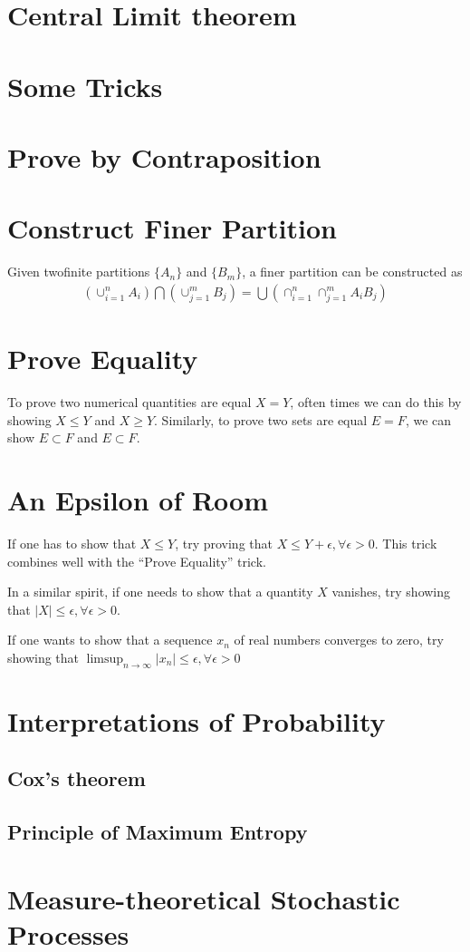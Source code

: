 \section{Central Limit theorem}

\section{Some Tricks}
\section{Prove by Contraposition}

\section{Construct Finer Partition}
Given twofinite partitions $\{A_n\}$ and $\{B_m\}$, a finer partition can be constructed as
\begin{align*}
	(\cup_{i=1}^n A_i) \bigcap (\cup_{j=1}^m B_j) = \bigcup (\cap_{i=1}^n \cap_{j=1}^m A_i B_j)
\end{align*}

\section{Prove Equality}
To prove two numerical quantities are equal $X=Y$, often times we can do this by showing $X \le Y$ and $X \ge Y$. Similarly, to prove two sets are equal $E = F$, we can show $E \subset F$ and $E \subset F$.

\section{An Epsilon of Room}
If one has to show that $X \le Y$, try proving that $X \le Y + \epsilon, \forall \epsilon > 0$. This trick combines well with the ``Prove Equality'' trick.

In a similar spirit, if one needs to show that a quantity $X$ vanishes, try showing that $|X| \le \epsilon, \forall \epsilon > 0$.

If one wants to show that a sequence $x_n$ of real numbers converges to zero, try showing that $\limsup_{n \to \infty} |x_n| \le \epsilon, \forall \epsilon > 0$



\section{Interpretations of Probability}
\subsection{Cox's theorem}
\subsection{Principle of Maximum Entropy}

\section{Measure-theoretical Stochastic Processes}







